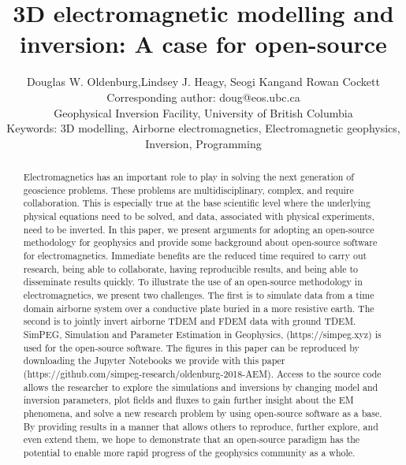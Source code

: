 \documentclass[paper]{geophysics}
\begin{document}
\title{3D electromagnetic modelling and inversion: A case for open-source}

\renewcommand{\thefootnote}{\fnsymbol{footnote}}


\author{
Douglas W. Oldenburg\footnotemark[1],\footnotemark[2] Lindsey J. Heagy\footnotemark[2], Seogi Kang\footnotemark[2] and Rowan Cockett\footnotemark[2] \\[16pt]
{\normalfont \small
\footnotemark[1]
Corresponding author: doug@eos.ubc.ca \\
\footnotemark[2]
Geophysical Inversion Facility, University of British Columbia
} \\[16pt]
{
\normalfont \small
Keywords: 3D modelling, Airborne electromagnetics, Electromagnetic geophysics, Inversion, Programming
}
}


\maketitle

\begin{abstract}
Electromagnetics has an important role to play in solving the next generation of geoscience problems. These problems are multidisciplinary, complex, and require collaboration. This is especially true at the base scientific level where the underlying physical equations need to be solved, and data, associated with physical experiments, need to be inverted. In this paper, we present arguments for adopting an open-source methodology for geophysics and provide some background about open-source software for electromagnetics. Immediate benefits are the reduced time required to carry out research, being able to collaborate, having reproducible results, and being able to disseminate results quickly. To illustrate the use of an open-source methodology in electromagnetics, we present two challenges. The first is to simulate data from a time domain airborne system over a conductive plate buried in a more resistive earth. The second is to jointly invert airborne TDEM and FDEM data with ground TDEM. SimPEG, Simulation and Parameter Estimation in Geophysics, (https://simpeg.xyz) is used for the open-source software. The figures in this paper can be reproduced by downloading the Jupyter Notebooks we provide with this paper (https://github.com/simpeg-research/oldenburg-2018-AEM). Access to the source code allows the researcher to explore the simulations and inversions by changing model and inversion parameters, plot fields and fluxes to gain further insight about the EM phenomena, and solve a new research problem by using open-source software as a base. By providing results in a manner that allows others to reproduce, further explore, and even extend them, we hope to demonstrate that an open-source paradigm has the potential to enable more rapid progress of the geophysics community as a whole.
\end{abstract}
\end{document}
